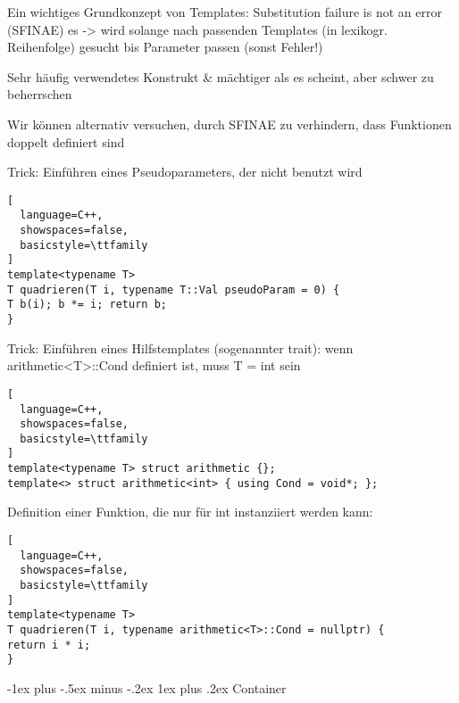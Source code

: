\documentclass[10pt]{article}
\makeatletter
\renewcommand{\subsubsection}{\@startsection{subsubsection}{3}{0mm}%
                                {-1ex plus -.5ex minus -.2ex}%
                                {1ex plus .2ex}%
                                {\normalfont\small\bfseries}}
\makeatother
\begin{document}
\begin{itemize*}
  \item Ein wichtiges Grundkonzept von Templates: Substitution failure is not an error (SFINAE) es -> wird solange nach passenden Templates (in lexikogr. Reihenfolge) gesucht bis Parameter passen (sonst Fehler!)
  \item Sehr häufig verwendetes Konstrukt \& mächtiger als es scheint, aber schwer zu beherrschen
  \begin{itemize*}
    \item Wir können alternativ versuchen, durch SFINAE zu verhindern, dass Funktionen doppelt definiert sind
    \item Trick: Einführen eines Pseudoparameters, der nicht benutzt wird
    \begin{lstlisting}[
  language=C++,
  showspaces=false,
  basicstyle=\ttfamily
]
template<typename T>
T quadrieren(T i, typename T::Val pseudoParam = 0) {
T b(i); b *= i; return b;
}
\end{lstlisting}
    
    \item Trick: Einführen eines Hilfstemplates (sogenannter trait): wenn arithmetic<T>::Cond definiert ist, muss T = int sein
    \begin{lstlisting}[
  language=C++,
  showspaces=false,
  basicstyle=\ttfamily
]
template<typename T> struct arithmetic {};
template<> struct arithmetic<int> { using Cond = void*; };
\end{lstlisting}
    
    \item Definition einer Funktion, die nur für int instanziiert werden kann:
    \begin{lstlisting}[
  language=C++,
  showspaces=false,
  basicstyle=\ttfamily
]
template<typename T>
T quadrieren(T i, typename arithmetic<T>::Cond = nullptr) {
return i * i;
}
\end{lstlisting}
  \end{itemize*}
\end{itemize*}

\subsubsection{Container}
\end{document}

